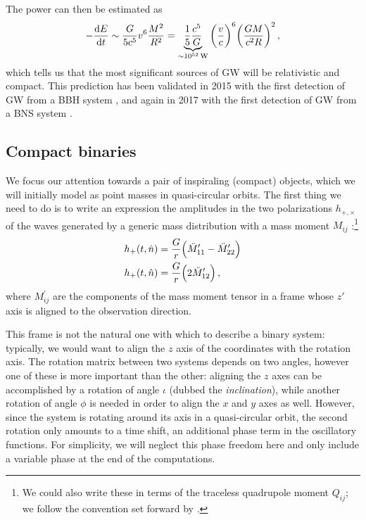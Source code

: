 \documentclass[main.tex]{subfiles}
\begin{document}
The power can then be estimated as 
%
\begin{align} \label{eq:energy-emission-estimate}
- \dv{E}{t} \sim \frac{G}{5 c^{5}} v^{6} \frac{M^2}{R^2} 
= \underbrace{\frac{1}{5} \frac{c^{5}}{G}}_{\sim\SI{e52}{W}} \qty( \frac{v}{c})^{6} \qty( \frac{GM}{c^2 R})^2
\,,
\end{align}
%
which tells us that the most significant sources of \ac{GW} will be relativistic and compact.
This prediction has been validated in 2015 with the first detection of \ac{GW} from a \ac{BBH} system \cite{abbottObservationGravitationalWaves2016}, and again in 2017 with the first detection of \ac{GW} from a \ac{BNS} system \cite{abbottGW170817ObservationGravitational2017}. 

\subsection{Compact binaries} \label{sec:compact-binaries-linear}

We focus our attention towards a pair of inspiraling (compact) objects, which we will initially model as point masses in quasi-circular orbits.
The first thing we need to do is to write an expression the amplitudes in the two polarizations \(h_{+, \times }\) of the waves generated by a generic mass distribution with a mass moment \(M_{ij}\) \cite[eqs.\ 3.67--68]{maggioreGravitationalWavesVolume2007}:\footnote{We could also write these in terms of the traceless quadrupole moment \(Q_{ij}\); we follow the convention set forward by \textcite{maggioreGravitationalWavesVolume2007}.} 
%
\begin{align}
h_{+}(t, \hat{n}) &= \frac{G}{r} \qty(\ddot{M}_{11}' - \ddot{M}_{22}')\\
h_{+}(t, \hat{n}) &= \frac{G}{r} \qty(2\ddot{M}_{12}')
\,,
\end{align}
%
where \(M^{\prime }_{ij}\) are the components of the mass moment tensor in a frame whose \(z'\) axis is aligned to the observation direction.

This frame is not the natural one with which to describe a binary system: typically, we would want to align the \(z\) axis of the coordinates with the rotation axis. 
The rotation matrix between two systems depends on two angles, however one of these is more important than the other: aligning the \(z\) axes can be accomplished by a rotation of angle \(\iota \) (dubbed the \emph{inclination}), while another rotation of angle \(\phi \) is needed in order to align the \(x\) and \(y\) axes as well. 
However, since the system is rotating around its axis in a quasi-circular orbit, the second rotation only amounts to a time shift, an additional phase term in the oscillatory functions. 
For simplicity, we will neglect this phase freedom here and only include a variable phase at the end of the computations.
\end{document}

